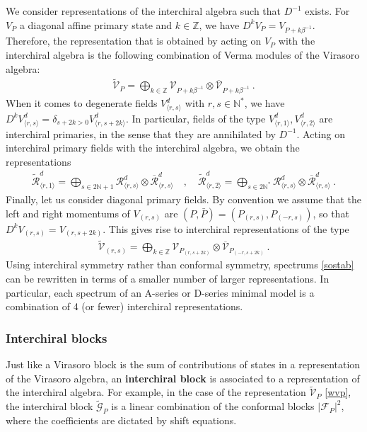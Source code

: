 \documentclass[12pt, a4paper]{article}
\theoremstyle{break}
\begin{document}
We consider representations of the interchiral algebra such that $D^{-1}$ exists. For $V_P$ a diagonal affine primary state and $k\in\mathbb{Z}$, we have $D^{k}V_P = V_{P+k\beta^{-1}}$. Therefore, the representation that is obtained by acting on $V_P$ with the interchiral algebra is the following combination of Verma modules of the Virasoro algebra:
\begin{align}
 \widetilde{\mathcal{V}}_P = \bigoplus_{k\in\mathbb{Z}} \mathcal{V}_{P+k\beta^{-1}}\otimes \overline{\mathcal{V}}_{P+k\beta^{-1}}\ . 
 \label{wvp}
\end{align}
When it comes to degenerate fields $V_{\langle r,s\rangle}^d$ with $r,s\in\mathbb{N}^*$, we have $D^k V_{\langle r,s\rangle}^d = \delta_{s+2k>0} V^d_{\langle r,s+2k\rangle}$. In particular, fields of the type $V_{\langle r,1\rangle}^d,V_{\langle r,2\rangle}^d$ are interchiral primaries, in the sense that they are annihilated by $D^{-1}$. Acting on interchiral primary fields with the interchiral algebra, we obtain the representations
\begin{align}
 \widetilde{\mathcal{R}}^d_{\langle r,1\rangle} = \bigoplus_{s\in 2\mathbb{N}+1} \mathcal{R}^d_{\langle r, s\rangle} \otimes \overline{\mathcal{R}}^d_{\langle r, s\rangle} 
 \quad ,\quad 
\widetilde{\mathcal{R}}^d_{\langle r,2\rangle} = \bigoplus_{s\in 2\mathbb{N}^*} \mathcal{R}^d_{\langle r, s\rangle} \otimes \overline{\mathcal{R}}^d_{\langle r, s\rangle}\ . 
 \end{align}
Finally, let us consider diagonal primary fields. By convention we assume that the left and right momentums of $V_{(r,s)}$ are $(P,\bar P)=(P_{(r,s)},P_{(-r,s)})$, so that $D^k V_{(r,s)} = V_{(r,s+2k)}$. This gives rise to interchiral representations of the type 
\begin{align}
 \widetilde{\mathcal{V}}_{(r,s)} = \bigoplus_{k\in\mathbb{Z}} \mathcal{V}_{P_{(r,s+2k)}}\otimes \overline{\mathcal{V}}_{P_{(-r,s+2k)}}\ . 
\end{align}
Using interchiral symmetry rather than conformal symmetry, spectrums \eqref{sostab} can be rewritten in terms of a smaller number of larger representations. In particular, each spectrum of an A-series or D-series minimal model is a combination of 4 (or fewer) interchiral representations. 

\subsubsection{Interchiral blocks}

Just like a Virasoro block is the sum of contributions of states in a representation of the Virasoro algebra, an \textbf{interchiral block} is associated to a representation of the interchiral algebra. For example, in the case of the representation $\widetilde{\mathcal{V}}_P$ \eqref{wvp}, the interchiral block $\widetilde{\mathcal{G}}_P$ is a linear combination of the conformal blocks $\left|\mathcal{F}_P\right|^2$, where the coefficients are dictated by shift equations. 
\end{document}
